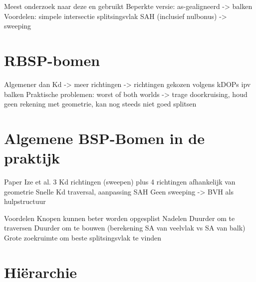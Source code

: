 


    Meest onderzoek naar deze en gebruikt
    Beperkte versie: as-gealigneerd -> balken
    Voordelen: simpele intersectie splitsingsvlak
    SAH (inclusief nulbonus) -> sweeping
\section{RBSP-bomen}
    Algemener dan Kd -> meer richtingen -> richtingen gekozen volgens
    kDOPs ipv balken
    Praktische problemen: worst of both worlds -> trage doorkruising, 
    houd geen rekening met geometrie, kan nog steeds niet goed splitsen

\section{Algemene BSP-Bomen in de praktijk}
    Paper Ize et al.
        3 Kd richtingen (sweepen) plus 4 richtingen afhankelijk van geometrie 
        Snelle Kd traversal, aanpassing SAH
        Geen sweeping -> BVH als hulpstructuur
    
    Voordelen
        Knopen kunnen beter worden opgesplist
    Nadelen
        Duurder om te traversen
        Duurder om te bouwen (berekening SA van veelvlak vs SA van balk)
        Grote zoekruimte om beste splitsingsvlak te vinden
\section{Hiërarchie}


